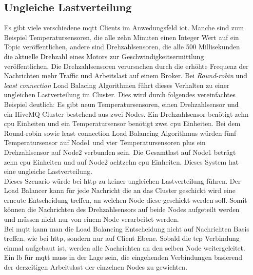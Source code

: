 \subsection{Ungleiche Lastverteilung} \label{sp:load}
Es gibt viele verschiedene \ac{mqtt} Clients im Anwedungsfeld \ac{iot}. Manche sind zum Beispiel Temperatursensoren, die alle zehn Minuten einen Integer Wert auf ein Topic veröffentlichen, andere sind Drehzahlsensoren, die alle 500 Millisekunden die aktuelle Drehzahl eines Motors zur Geschwindigkeitsermittlung veröffentlichen.
Die Drehzahlsensoren verursachen durch die erhöhte Frequenz der Nachrichten mehr Traffic und Arbeitslast auf einem Broker.
Bei \textit{Round-robin} und \textit{least connection} Load Balacing Algorithmen führt dieses Verhalten zu einer ungleichen Lastverteilung im Cluster. Dies wird durch folgendes vereinfachtes Beispiel deutlich:
Es gibt neun Temperatursensoren, einen Drehzahlsensor und ein HiveMQ Cluster bestehend aus zwei Nodes. Ein Drehzahlsensor benötigt zehn \ac{cpu} Einheiten und ein Temperatursensor benötigt zwei \ac{cpu} Einheiten. Bei dem Round-robin sowie least connection Load Balancing Algorithmus würden fünf Temperatursensor auf Node1 und vier Temperatursensoren plus ein Drehzahlsensor auf Node2 verbunden sein. Die Gesamtlast auf Node1 beträgt zehn \ac{cpu} Einheiten und auf Node2 achtzehn \ac{cpu} Einheiten. Dieses System hat eine ungleiche Lastverteilung.\\
Dieses Szenario würde bei \ac{http} zu keiner ungleichen Lastverteilung führen. Der Load Balancer kann für jede Nachricht die an das Cluster geschickt wird eine erneute Entscheidung treffen, an welchen Node diese geschickt werden soll. Somit können die Nachrichten des Drehzahlsensors auf beide Nodes aufgeteilt werden und müssen nicht nur von einem Node verarbeitet werden.\\
Bei \ac{mqtt} kann man die Load Balancing Entscheidung nicht auf Nachrichten Basis treffen, wie bei \ac{http}, sondern nur auf Client Ebene. Sobald die \ac{tcp} Verbindung einmal aufgebaut ist, werden alle Nachrichten an den selben Node weitergeleitet.\\
Ein \ac{lb} für \ac{mqtt} muss in der Lage sein, die eingehenden Verbindungen basierend der derzeitigen Arbeitslast der einzelnen Nodes zu gewichten.


